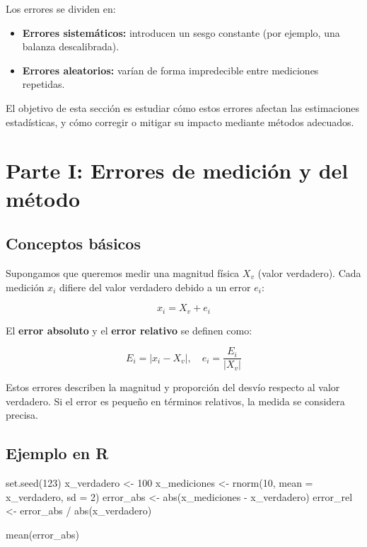 \documentclass[
  spanish,
  letterpaper,
  DIV=11,
  numbers=noendperiod]{scrreprt}
\newenvironment{Shaded}{\begin{snugshade}}{\end{snugshade}}
\newcommand{\AttributeTok}[1]{\textcolor[rgb]{0.40,0.45,0.13}{#1}}
\newcommand{\DecValTok}[1]{\textcolor[rgb]{0.68,0.00,0.00}{#1}}
\newcommand{\FunctionTok}[1]{\textcolor[rgb]{0.28,0.35,0.67}{#1}}
\newcommand{\NormalTok}[1]{\textcolor[rgb]{0.00,0.23,0.31}{#1}}
\newcommand{\OtherTok}[1]{\textcolor[rgb]{0.00,0.23,0.31}{#1}}
\newcommand{\SpecialCharTok}[1]{\textcolor[rgb]{0.37,0.37,0.37}{#1}}
\providecommand{\tightlist}{%
  \setlength{\itemsep}{0pt}\setlength{\parskip}{0pt}}
\begin{document}
Los errores se dividen en:

\begin{itemize}
\tightlist
\item
  \textbf{Errores sistemáticos:} introducen un sesgo constante (por
  ejemplo, una balanza descalibrada).
\item
  \textbf{Errores aleatorios:} varían de forma impredecible entre
  mediciones repetidas.
\end{itemize}

El objetivo de esta sección es estudiar cómo estos errores afectan las
estimaciones estadísticas, y cómo corregir o mitigar su impacto mediante
métodos adecuados.


\chapter{Parte I: Errores de medición y del
método}\label{parte-i-errores-de-mediciuxf3n-y-del-muxe9todo}

\section{Conceptos básicos}\label{conceptos-buxe1sicos-1}

Supongamos que queremos medir una magnitud física \(X_v\) (valor
verdadero). Cada medición \(x_i\) difiere del valor verdadero debido a
un error \(e_i\):

\[x_i = X_v + e_i\]

El \textbf{error absoluto} y el \textbf{error relativo} se definen como:

\[E_i = |x_i - X_v|, \quad e_i = \frac{E_i}{|X_v|}\]

Estos errores describen la magnitud y proporción del desvío respecto al
valor verdadero. Si el error es pequeño en términos relativos, la medida
se considera precisa.

\section{Ejemplo en R}\label{ejemplo-en-r}

\begin{Shaded}
\begin{Highlighting}[]
\FunctionTok{set.seed}\NormalTok{(}\DecValTok{123}\NormalTok{)}
\NormalTok{x\_verdadero }\OtherTok{\textless{}{-}} \DecValTok{100}
\NormalTok{x\_mediciones }\OtherTok{\textless{}{-}} \FunctionTok{rnorm}\NormalTok{(}\DecValTok{10}\NormalTok{, }\AttributeTok{mean =}\NormalTok{ x\_verdadero, }\AttributeTok{sd =} \DecValTok{2}\NormalTok{)}
\NormalTok{error\_abs }\OtherTok{\textless{}{-}} \FunctionTok{abs}\NormalTok{(x\_mediciones }\SpecialCharTok{{-}}\NormalTok{ x\_verdadero)}
\NormalTok{error\_rel }\OtherTok{\textless{}{-}}\NormalTok{ error\_abs }\SpecialCharTok{/} \FunctionTok{abs}\NormalTok{(x\_verdadero)}

\FunctionTok{mean}\NormalTok{(error\_abs)}
\end{Highlighting}
\end{Shaded}
\end{document}
